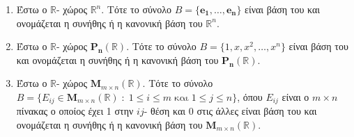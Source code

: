 \begin{examples}
\item {}
    \begin{enumerate}
        \item Έστω ο $ \mathbb{R} $- χώρος $ \mathbb{R}^{n} $. Τότε το σύνολο 
            $ B = \{ \mathbf{e_{1}}, \ldots, \mathbf{e_{n}} \} $ είναι βάση του και 
            ονομάζεται η συνήθης ή η κανονική βάση του $ \mathbb{R}^{n} $.
        \item Έστω ο $ \mathbb{R} $- χώρος $ \mathbf{P_{n}}(\mathbb{R}) $. Τότε το 
            σύνολο $ B = \{ 1, x, x^{2}, \ldots, x^{n} \} $ είναι βάση του και 
            ονομάζεται η συνήθης ή η κανονική βάση του $ \mathbf{P_{n}}(\mathbb{R}) $.
        \item Έστω ο $ \mathbb{R} $- χώρος $ \textbf{M}_{m \times n}(\mathbb{R}) $. 
            Τότε το σύνολο 
            $ B = \{ E_{ij} \in \textbf{M}_{m \times n}(\mathbb{R}) \; : \; 1 \leq i
            \leq m \; \text{και} \; 1 \leq j \leq n\}  $, όπου $ E _{ij} $ είναι ο 
            $ m \times n $ πίνακας ο οποίος έχει 1 στην $ ij $- θέση και 0 στις άλλες 
            είναι βάση του και ονομάζεται η συνήθης ή η κανονική βάση του 
            $ \textbf{M}_{m \times n}(\mathbb{R}) $.
    \end{enumerate}
\end{examples}

